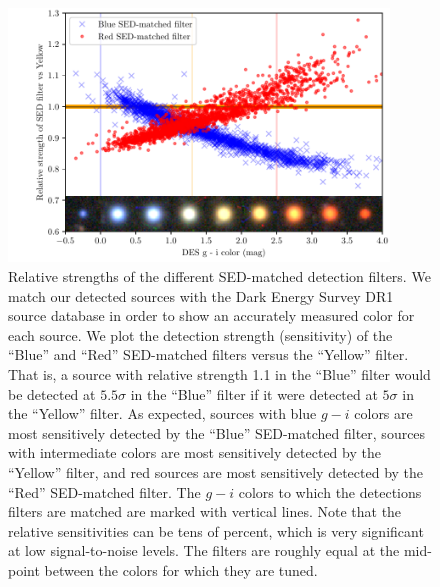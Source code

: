\documentclass[11pt,letterpaper,linenumbers]{aastex63}
\begin{document}
\begin{figure}
  \begin{center}
    \includegraphics[width=0.9\textwidth]{strength}
    \caption{Relative strengths of the different SED-matched detection
      filters.  We match our detected sources with the Dark Energy
      Survey DR1 source database in order to show an accurately
      measured color for each source.  We plot the detection strength
      (sensitivity) of the ``Blue'' and ``Red'' SED-matched filters
      versus the ``Yellow'' filter.  That is, a source with relative
      strength 1.1 in the ``Blue'' filter would be detected at $5.5
      \sigma$ in the ``Blue'' filter if it were detected at $5 \sigma$
      in the ``Yellow'' filter.  As expected, sources with blue $g-i$
      colors are most sensitively detected by the ``Blue'' SED-matched
      filter, sources with intermediate colors are most sensitively
      detected by the ``Yellow'' filter, and red sources are most
      sensitively detected by the ``Red'' SED-matched filter.  The
      $g-i$ colors to which the detections filters are matched are
      marked with vertical lines.  Note that the relative
      sensitivities can be tens of percent, which is very significant
      at low signal-to-noise levels.  The filters are roughly equal at
      the mid-point between the colors for which they are tuned.
      \label{fig:strength}}
  \end{center}
\end{figure}
\end{document}
